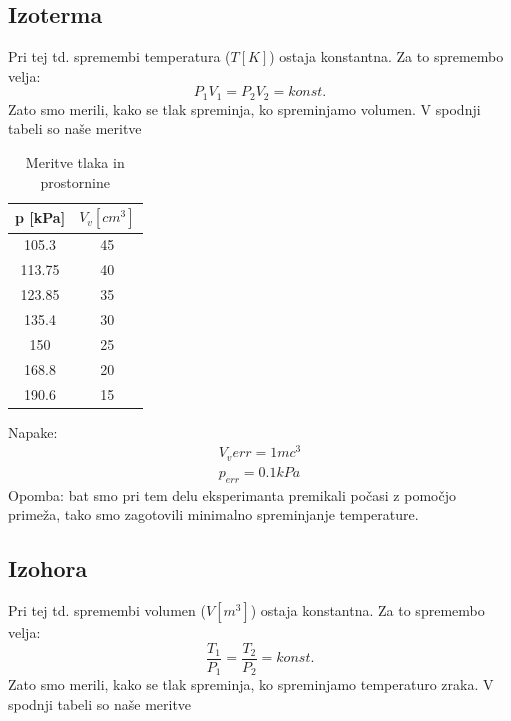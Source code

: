 \documentclass[11pt]{article}
\begin{document}
        \subsection{Izoterma}
        Pri tej td. spremembi temperatura ($T[K]$) ostaja konstantna.
        Za to spremembo velja:
        \[
            P_1 V_1 = P_2 V_2 = konst.
        \]
        Zato smo merili, kako se tlak spreminja, ko spreminjamo volumen.
        V spodnji tabeli so naše meritve

        \begin{table}[H]
            \centering
            \begin{tabular}{|c|c|}
                \hline
                \textbf{p [kPa]} & \textbf{$V_v [cm^3]$} \\
                \hline
                105.3  & 45  \\
                113.75 & 40  \\
                123.85 & 35  \\
                135.4  & 30  \\
                150    & 25  \\
                168.8  & 20  \\
                190.6  & 15  \\
                \hline
            \end{tabular}
            \caption{Meritve tlaka in prostornine}
            \label{tab: meritve1}
        \end{table}
        Napake:
        \begin{align*}
            V_v{err} = 1 mc^3 \\
            p_{err} = 0.1 kPa
        \end{align*}
        Opomba: bat smo pri tem delu eksperimanta premikali počasi z pomočjo primeža, tako smo zagotovili minimalno spreminjanje temperature.

        \subsection{Izohora}
        Pri tej td. spremembi volumen ($V[m^3]$) ostaja konstantna.
        Za to spremembo velja:
        \[
            \frac{T_1}{P_1} = \frac{T_2}{P_2} = konst.
        \]
        Zato smo merili, kako se tlak spreminja, ko spreminjamo temperaturo zraka.
        V spodnji tabeli so naše meritve
\end{document}
